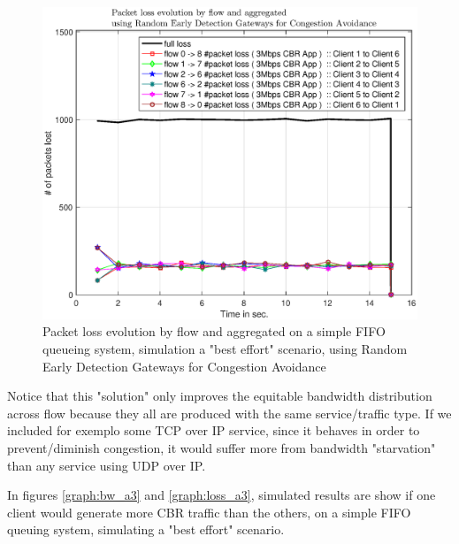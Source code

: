 \documentclass[conference,compsoc]{IEEEtran}
\begin{document}
    
    \begin{figure}[H]
    \centering
    \includegraphics[width=1\columnwidth]{EPS/A/loss_a2_red.eps}
    \caption{Packet loss evolution by flow and aggregated on a simple FIFO queueing system, simulation a "best effort" scenario, using Random Early Detection Gateways for Congestion Avoidance}\label{graph:loss_a2_red}
    \end{figure}
    
    Notice that this "solution" only improves the equitable bandwidth distribution across flow because they all are produced with the same service/traffic type. If we included for exemplo some TCP over IP service, since it behaves in order to prevent/diminish congestion, it would suffer more from  bandwidth "starvation" than any service using UDP over IP. \par
    In figures   \ref{graph:bw_a3} and \ref{graph:loss_a3}, simulated results are show if one client would generate more CBR traffic than
the others, on a simple FIFO queuing system, simulating a "best effort" scenario.
\end{document}

